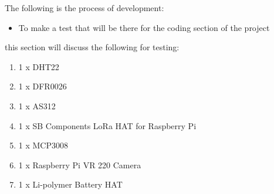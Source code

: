 The following is the process of development:
\begin{itemize}
    \item To make a test  that will be  there for  the coding section of  the  project 
\end{itemize}
this section will discuss the  following for  testing:
\begin{enumerate}
    \item 1 x DHT22
    \item 1 x DFR0026
    \item 1 x AS312
    \item 1 x SB Components LoRa HAT for Raspberry Pi
    \item 1 x MCP3008
    \item 1 x Raspberry Pi VR 220 Camera
    \item  1 x Li-polymer Battery HAT 
\end{enumerate}
